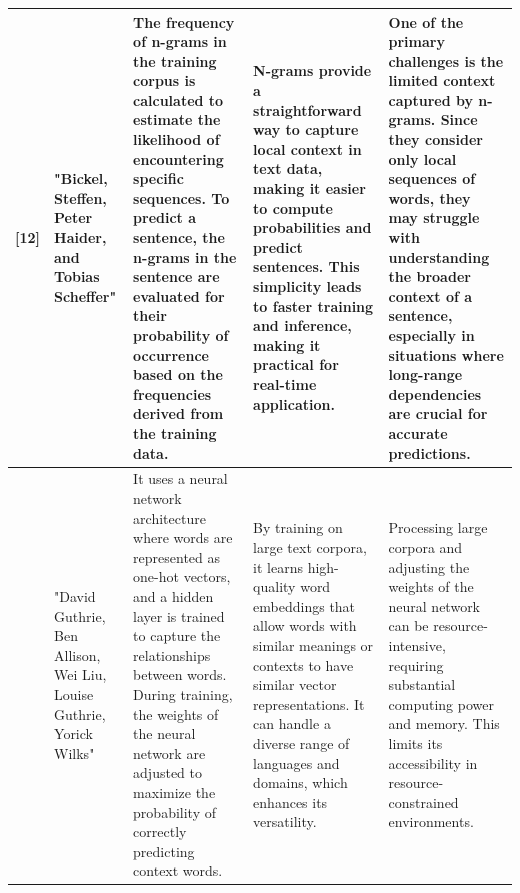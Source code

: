 \documentclass[conference]{IEEEtran}
\begin{document}
\begin{table}
\begin{center}
\begin{tabular}{ |p{1cm}|p{2cm}|p{4cm}|p{4cm}|p{4cm}| }
[12]  &  "Bickel, Steffen, Peter Haider, and Tobias Scheffer" &  The frequency of n-grams in the training corpus is calculated to estimate the likelihood of encountering specific sequences. To predict a sentence, the n-grams in the sentence are evaluated for their probability of occurrence based on the frequencies derived from the training data. &  N-grams provide a straightforward way to capture local context in text data, making it easier to compute probabilities and predict sentences. This simplicity leads to faster training and inference, making it practical for real-time application. &  One of the primary challenges is the limited context captured by n-grams. Since they consider only local sequences of words, they may struggle with understanding the broader context of a sentence, especially in situations where long-range dependencies are crucial for accurate predictions.  \\
\hline
[13]  & "David Guthrie, Ben Allison, Wei Liu, Louise Guthrie, Yorick Wilks" &  It uses a neural network architecture where words are represented as one-hot vectors, and a hidden layer is trained to capture the relationships between words. During training, the weights of the neural network are adjusted to maximize the probability of correctly predicting context words. &  By training on large text corpora, it learns high-quality word embeddings that allow words with similar meanings or contexts to have similar vector representations. It can handle a diverse range of languages and domains, which enhances its versatility. &  Processing large corpora and adjusting the weights of the neural network can be resource-intensive, requiring substantial computing power and memory. This limits its accessibility in resource-constrained environments.  \\
\hline
\end{tabular}
\end{center}
\end{table}
\end{document}

